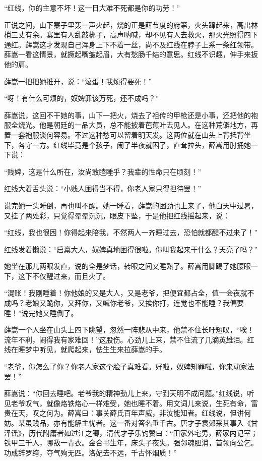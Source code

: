 “红线，你的主意不坏！这一日大难不死都是你的功劳！” 

正说之间，山下寨子里轰一声火起，烧的正是薛节度的府第，火头蹿起来，高出林梢三丈有余。寨里有人乱敲梆子，高声呐喊，却不见有人去救火，那火光照得四下通红。薛嵩这才发现自己浑身上下不着一丝，尚不及红线在脖子上系一条红领带。薛嵩一看这情景，就撅起嘴皱起眉，大有愁肠千结的意思。红线不识趣，伸手来扳他的肩。 

薛嵩一把把她推开，说：“滚蛋！我烦得要死！” 

“呀！有什么可烦的，奴婢罪该万死，还不成吗？” 

薛嵩说，这回不干她的事，山下一把火，烧去了祖传的甲枪还是小事，还把他的袍服全烧光。他是朝廷的一品大员，总不能披着芭蕉叶去见人。在这种荒僻地方，再置一套袍服谈何容易。不过这种愁可以留着明天发。这两位就在山头上背抵背坐下，各守一方。红线毕竟是个孩子，闹了半夜就困了，直耷拉头，薛嵩用肘捅她一下说： 

“贱婢，这是什么所在，汝尚敢瞌睡乎？我辈的性命只在顷刻！” 

红线大着舌头说：“小贱人困得当不得，你老人家只得担待罢！” 

说完她一头睡倒，再也叫不醒。她一睡着，薛嵩的困劲也上来了，他白天中过暑，又挂了两处彩，只觉得晕晕沉沉，眼皮下坠，于是他把红线摇起来，说： 

“红线，我也很困！你得起来陪我，不然两人一齐睡过去，恐怕就都醒不过来了！” 

红线发着懒说：“启禀大人，奴婢真地困得很啦。你叫我起来干什么？天亮了吗？” 

她坐在那儿两眼发直，说的全是梦话，转眼之间又睡熟了。薛嵩用脚踢了她腰眼一下，这下不仅醒过来，而且火了。 

“混账！我刚睡着！你他娘的又是大人，又是老爷，把便宜都占全，值一会夜就不成吗？老娘又跪你，又拜你，又喊你老爷，又挨你打，连觉也不能睡？我偏要睡！”说完她又睡倒了。 

薛嵩一个人坐在山头上四下眺望，忽然一阵悲从中来，他禁不住长吁短叹，“唉！流年不利，闹得我有家难回！”这股伤。心劲儿上来，禁不住流了几滴英雄泪。红线在睡梦中听见，就爬起来，怯生生来拉薛嵩的手。 

“老爷，你怎么了你？你老人家这个脸子真难看。好啦，奴婢知罪啦，你来动家法罢！” 

薛嵩说：“你回去睡吧。老爷我的精神劲儿上来，守到天明不成问题。”红线说，听见老爷叹气，就像烙铁烙心一样难受，她也睡不着。用文词儿来说，生死有命，富贵在天，叹之何为。薛嵩曰：事关薛氏百年声威，非汝能知者。红线说，但讲何妨。某虽贱品，亦有能解主忧者。这一番对答名垂千古。唐才子袁郊采其事入《甘泽谣》，历代附庸者如过江之鲫，清代才子乐钓赞曰：“田家外宅男，薛家内记室；铁甲三千人，哪敌一青衣。金合书生年，床头子夜失。强邻魂胆消，首领向公乞。功成辞罗绔，夺气殉无匹。洛妃去不远，千古怀烟质！” 

